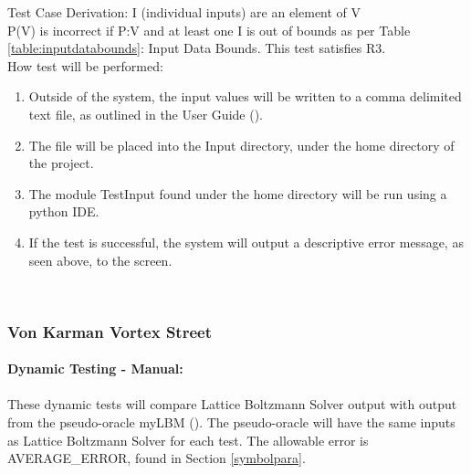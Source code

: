 \documentclass[12pt, titlepage]{article}
\newcommand{\myprogname}{Lattice Boltzmann Solver}
\begin{document}
\begin{enumerate}
Test Case Derivation: 
I (individual inputs) are an element of V\\
P(V) is incorrect if P:V and at least one I is out of bounds as per Table \ref{table:inputdatabounds}: Input Data Bounds. This test satisfies R3.\\ 

					
How test will be performed: 

\begin{enumerate}
\item Outside of the system, the input values will be written to a comma delimited text file, as outlined in the User Guide (\citet{LBM_UserGuide_PM}).
\item The file will be placed into the Input directory, under the home directory of the project.
\item The module TestInput found under the home directory will be run using a python IDE.
\item If the test is successful, the system will output a descriptive error message, as seen above, to the screen.\\


\end{enumerate}

\end{enumerate}

~\newpage

\subsubsection{Von Karman Vortex Street}
\label{frvkvs}
		
\paragraph{Dynamic Testing - Manual:}
\paragraph{} These dynamic tests will compare {\myprogname} output with output from the pseudo-oracle myLBM (\citet{pylbmcode}). The pseudo-oracle will have the same inputs as {\myprogname} for each test. The allowable error is AVERAGE\_ERROR, found in Section \ref{symbolpara}.
\end{document}

